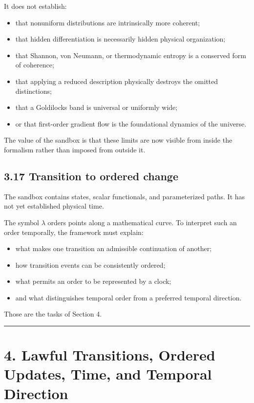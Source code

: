 \documentclass[
  11pt,
]{article}
\providecommand{\tightlist}{%
  \setlength{\itemsep}{0pt}\setlength{\parskip}{0pt}}
\begin{document}
It does not establish:

\begin{itemize}
\tightlist
\item
  that nonuniform distributions are intrinsically more coherent;
\item
  that hidden differentiation is necessarily hidden physical
  organization;
\item
  that Shannon, von Neumann, or thermodynamic entropy is a conserved
  form of coherence;
\item
  that applying a reduced description physically destroys the omitted
  distinctions;
\item
  that a Goldilocks band is universal or uniformly wide;
\item
  or that first-order gradient flow is the foundational dynamics of the
  universe.
\end{itemize}

The value of the sandbox is that these limits are now visible from
inside the formalism rather than imposed from outside it.

\subsection{3.17 Transition to ordered
change}\label{transition-to-ordered-change}

The sandbox contains states, scalar functionals, and parameterized
paths. It has not yet established physical time.

The symbol \(\lambda\) orders points along a mathematical curve. To
interpret such an order temporally, the framework must explain:

\begin{itemize}
\tightlist
\item
  what makes one transition an admissible continuation of another;
\item
  how transition events can be consistently ordered;
\item
  what permits an order to be represented by a clock;
\item
  and what distinguishes temporal order from a preferred temporal
  direction.
\end{itemize}

Those are the tasks of Section 4.

\begin{center}\rule{0.5\linewidth}{0.5pt}\end{center}

\section{4. Lawful Transitions, Ordered Updates, Time, and Temporal
Direction}\label{lawful-transitions-ordered-updates-time-and-temporal-direction}
\end{document}
